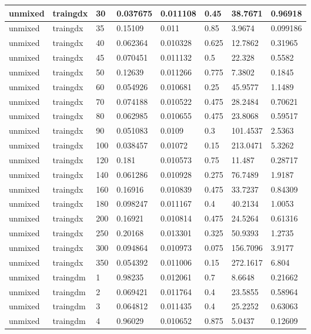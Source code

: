\begin{longtable}{llllllll}
unmixed & traingdx & 30 & 0.037675 & 0.011108 & 0.45 & 38.7671 & 0.96918 \\ \hline 
unmixed & traingdx & 35 & 0.15109 & 0.011 & 0.85 & 3.9674 & 0.099186 \\ \hline 
unmixed & traingdx & 40 & 0.062364 & 0.010328 & 0.625 & 12.7862 & 0.31965 \\ \hline 
unmixed & traingdx & 45 & 0.070451 & 0.011132 & 0.5 & 22.328 & 0.5582 \\ \hline 
unmixed & traingdx & 50 & 0.12639 & 0.011266 & 0.775 & 7.3802 & 0.1845 \\ \hline 
unmixed & traingdx & 60 & 0.054926 & 0.010681 & 0.25 & 45.9577 & 1.1489 \\ \hline 
unmixed & traingdx & 70 & 0.074188 & 0.010522 & 0.475 & 28.2484 & 0.70621 \\ \hline 
unmixed & traingdx & 80 & 0.062985 & 0.010655 & 0.475 & 23.8068 & 0.59517 \\ \hline 
unmixed & traingdx & 90 & 0.051083 & 0.0109 & 0.3 & 101.4537 & 2.5363 \\ \hline 
unmixed & traingdx & 100 & 0.038457 & 0.01072 & 0.15 & 213.0471 & 5.3262 \\ \hline 
unmixed & traingdx & 120 & 0.181 & 0.010573 & 0.75 & 11.487 & 0.28717 \\ \hline 
unmixed & traingdx & 140 & 0.061286 & 0.010928 & 0.275 & 76.7489 & 1.9187 \\ \hline 
unmixed & traingdx & 160 & 0.16916 & 0.010839 & 0.475 & 33.7237 & 0.84309 \\ \hline 
unmixed & traingdx & 180 & 0.098247 & 0.011167 & 0.4 & 40.2134 & 1.0053 \\ \hline 
unmixed & traingdx & 200 & 0.16921 & 0.010814 & 0.475 & 24.5264 & 0.61316 \\ \hline 
unmixed & traingdx & 250 & 0.20168 & 0.013301 & 0.325 & 50.9393 & 1.2735 \\ \hline 
unmixed & traingdx & 300 & 0.094864 & 0.010973 & 0.075 & 156.7096 & 3.9177 \\ \hline 
unmixed & traingdx & 350 & 0.054392 & 0.011006 & 0.15 & 272.1617 & 6.804 \\ \hline 
unmixed & traingdm & 1 & 0.98235 & 0.012061 & 0.7 & 8.6648 & 0.21662 \\ \hline 
unmixed & traingdm & 2 & 0.069421 & 0.011764 & 0.4 & 23.5855 & 0.58964 \\ \hline 
unmixed & traingdm & 3 & 0.064812 & 0.011435 & 0.4 & 25.2252 & 0.63063 \\ \hline 
unmixed & traingdm & 4 & 0.96029 & 0.010652 & 0.875 & 5.0437 & 0.12609 \\ \hline 

\end{longtable}
